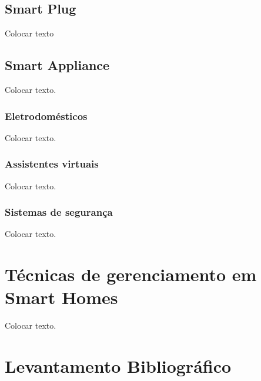 \documentclass[12pt,article,compsoc]{IEEEtran}
\begin{document}
\subsection{Smart Plug}\label{sec:smartPlug}

Colocar texto


\subsection{Smart Appliance}

Colocar texto.


\subsubsection{Eletrodomésticos}

Colocar texto.


\subsubsection{Assistentes virtuais}

Colocar texto.


\subsubsection{Sistemas de segurança}

Colocar texto.


\section{Técnicas de gerenciamento em Smart Homes}\label{sec:tecnicasDeGerenciamento}

Colocar texto.


\section{Levantamento Bibliográfico}\label{sec:levantamentoBibliografico}
\end{document}
